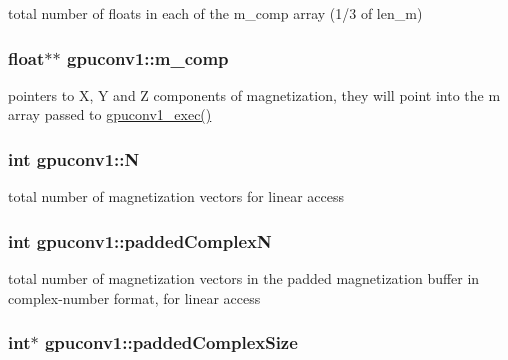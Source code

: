 total number of floats in each of the m\_\-comp array (1/3 of len\_\-m) 

\hypertarget{structgpuconv1_a4d2d201f61019be9026134f0a08a15b5}{
\subsubsection[{m\_\-comp}]{\setlength{\rightskip}{0pt plus 5cm}float$\ast$$\ast$ {\bf gpuconv1::m\_\-comp}}}
\label{structgpuconv1_a4d2d201f61019be9026134f0a08a15b5}


pointers to X, Y and Z components of magnetization, they will point into the m array passed to \hyperlink{gpuconv1_8h_a290a0200b1639a156c1767f74bf5b94e}{gpuconv1\_\-exec()} 

\hypertarget{structgpuconv1_a1ba1a0d9be30864cbdc05a94ac43f747}{
\subsubsection[{N}]{\setlength{\rightskip}{0pt plus 5cm}int {\bf gpuconv1::N}}}
\label{structgpuconv1_a1ba1a0d9be30864cbdc05a94ac43f747}


total number of magnetization vectors for linear access 

\hypertarget{structgpuconv1_ae7087efad8a8759e05ba5b24be745155}{
\subsubsection[{paddedComplexN}]{\setlength{\rightskip}{0pt plus 5cm}int {\bf gpuconv1::paddedComplexN}}}
\label{structgpuconv1_ae7087efad8a8759e05ba5b24be745155}


total number of magnetization vectors in the padded magnetization buffer in complex-\/number format, for linear access 

\hypertarget{structgpuconv1_a85e7af21492a5af71523d8007a999381}{
\subsubsection[{paddedComplexSize}]{\setlength{\rightskip}{0pt plus 5cm}int$\ast$ {\bf gpuconv1::paddedComplexSize}}}
\label{structgpuconv1_a85e7af21492a5af71523d8007a999381}


